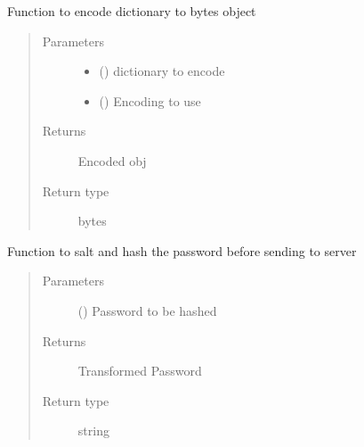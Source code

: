 \documentclass[letterpaper,10pt,english]{sphinxmanual}
\begin{document}
\begin{fulllineitems}
\begin{fulllineitems}
\label{\detokenize{Message:Message.Message._json_encode}}
Function to encode dictionary to bytes object
\begin{quote}\begin{description}
\item[{Parameters}] \leavevmode\begin{itemize}
\item {} 
 () \textendash{} dictionary to encode

\item {} 
 () \textendash{} Encoding to use

\end{itemize}

\item[{Returns}] \leavevmode
Encoded obj

\item[{Return type}] \leavevmode
bytes

\end{description}\end{quote}

\end{fulllineitems}


\begin{fulllineitems}
\label{\detokenize{Message:Message.Message._hash_password}}
Function to salt and hash the password before sending to server
\begin{quote}\begin{description}
\item[{Parameters}] \leavevmode
{} () \textendash{} Password to be hashed

\item[{Returns}] \leavevmode
Transformed Password

\item[{Return type}] \leavevmode
string


\end{description}
\end{quote}
\end{fulllineitems}
\end{fulllineitems}
\end{document}
